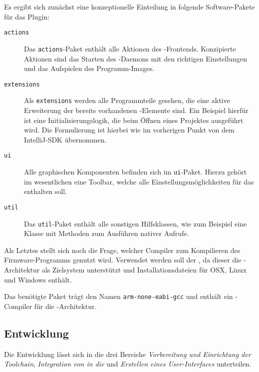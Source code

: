         Es ergibt sich zunächst eine konzeptionelle Einteilung in folgende Software-Pakete für das Plugin:
        \begin{description}
            \item[\texttt{actions}] Das \texttt{actions}-Paket enthält alle Aktionen des -Frontends.
            Konzipierte Aktionen sind das Starten des -Daemons mit den richtigen Einstellungen und das
            Aufspielen des Programm-Images.
            \item[\texttt{extensions}] Als \texttt{extensions} werden alle Programmteile gesehen, die eine aktive
            Erweiterung der bereits vorhandenen -Elemente sind. Ein Beispiel hierfür ist eine Initialisierungslogik,
            die beim Öffnen eines Projektes ausgeführt wird. Die Formulierung ist hierbei wie im vorherigen Punkt von
            dem IntelliJ-SDK übernommen.
            \item[\texttt{ui}] Alle graphischen Komponenten befinden sich im \texttt{ui}-Paket. Hierzu gehört im
            wesentlichen eine Toolbar, welche alle Einstellungsmöglichkeiten für das  enthalten soll.
            \item[\texttt{util}] Das \texttt{util}-Paket enthält alle sonstigen Hilfsklassen, wie zum Beispiel eine
            Klasse mit Methoden zum Ausführen nativer Aufrufe.
        \end{description}

        Als Letztes stellt sich noch die Frage, welcher Compiler zum Kompilieren des Firmware-Programms genutzt
        wird. Verwendet werden soll der , da dieser die -Architektur als Zielsystem unterstützt und
        Installationsdateien für OSX, Linux und Windows enthält.

        Das benötigte Paket trägt den Namen \texttt{arm-none-eabi-gcc} und enthält ein -Compiler für die -Architektur.

    \subsection{Entwicklung}
        Die Entwicklung lässt sich in die drei Bereiche \textit{Vorbereitung und Einrichtung der Toolchain},
        \textit{Integration von  in die } und \textit{Erstellen eines User-Interfaces} unterteilen.

